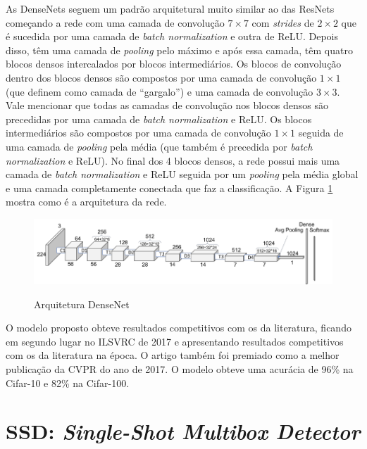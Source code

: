 As \ac{DenseNet}s seguem um padrão arquitetural muito similar ao das \ac{ResNet}s começando a rede com uma camada de convolução $7\times7$ com \textit{strides} de $2\times2$ que é sucedida por uma camada de \textit{batch normalization} e outra de \ac{ReLU}. Depois disso, têm uma camada de \textit{pooling} pelo máximo e após essa camada, têm quatro blocos densos intercalados por blocos intermediários. Os blocos de convolução dentro dos blocos densos são compostos por uma camada de convolução $1\times1$ (que  definem como camada de ``gargalo'') e uma camada de convolução $3\times3$. Vale mencionar que todas as camadas de convolução nos blocos densos são precedidas por uma camada de \textit{batch normalization} e \ac{ReLU}. Os blocos intermediários são compostos por uma camada de convolução $1\times1$ seguida de uma camada de \textit{pooling} pela média (que também é precedida por \textit{batch normalization} e \ac{ReLU}). No final dos 4 blocos densos, a rede possui mais uma camada de \textit{batch normalization} e \ac{ReLU} seguida por um \textit{pooling} pela média global e uma camada completamente conectada que faz a classificação. A Figura \ref{fig:archdensenet} mostra como é a arquitetura da rede.

\begin{figure}[t]
	\setlength{\abovecaptionskip}{0pt}
	\setlength{\belowcaptionskip}{0pt}
	\caption[Arquitetura DenseNet]{Arquitetura DenseNet}
	\centering
	\includegraphics[width=.7\textwidth]{imagem/0x_densenet_arch.png}
	\captionsetup{justification=centering}
	\label{fig:archdensenet}
\end{figure}

O modelo proposto obteve resultados competitivos com os da literatura, ficando em segundo lugar no \ac{ILSVRC} de 2017 e apresentando resultados competitivos com os da literatura na época. O artigo também foi premiado como a melhor publicação da \ac{CVPR} do ano de 2017. O modelo obteve uma acurácia de 96\% na Cifar-10 e 82\% na Cifar-100.

\section{SSD: \textit{Single-Shot Multibox Detector}}
\label{secao:3:2}

